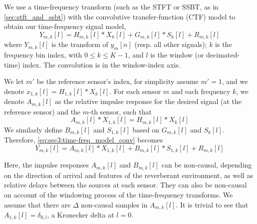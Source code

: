 	We use a time-frequency transform (such as the STFT or SSBT, as in \cref{sec:stft_and_ssbt}) with the convolutive transfer-function (CTF) model \cite{talmon_relative_2009} to obtain our time-frequency signal model,
	\begin{equation}
		\label{eq:sec3:time-freq_model_conv}
		Y_{m,k}[l] = H_{m,k}[l] \ast X_{k}[l] + G_{m,k}[l] \ast S_{k}[l] + R_{m,k}[l]
	\end{equation}
	where $Y_{m,k}[l]$ is the transform of $y_m[n]$ (resp. all other signals); $k$ is the frequency bin index, with $0 \leq k \leq K-1$, and $l$ is the window (or decimated-time) index. The convolution is in the window-index axis.
	
	We let $m'$ be the reference sensor's index, for simplicity assume $m' = 1$, and we denote $x_{1,k}[l] = H_{1,k}[l] \ast X_{k}[l]$. For each sensor $m$ and each frequency $k$, we denote $A_{m,k}[l]$ as the relative impulse response for the desired signal (at the reference sensor) and the $m$-th sensor, such that
	\begin{equation}
		A_{m,k}[l] \ast X_{1,k}[l] = H_{m,k}[l] \ast X_{k}[l]
	\end{equation} 
	We similarly define $B_{m,k}[l]$ and $S_{1,k}[l]$ based on $G_{m,k}[l]$ and $S_{k}[l]$. Therefore, \cref{eq:sec3:time-freq_model_conv} becomes
	\begin{equation}
		Y_{m,k}[l] = A_{m,k}[l] \ast X_{1,k}[l] + B_{m,k}[l] \ast S_{1,k}[l] + R_{m,k}[l]
	\end{equation}
	
	Here, the impulse responses $A_{m,k}[l]$ and $B_{m,k}[l]$ can be non-causal, depending on the direction of arrival and features of the reverberant environment, as well as relative delays between the sources at each sensor. They can also be non-causal on account of the windowing process of the time-frequency transforms. We assume that there are $\Delta$ non-causal samples in $A_{m,k}[l]$. It is trivial to see that $A_{1,k}[l] = \delta_{0,l}$, a Kronecker delta at $l = 0$.
	
